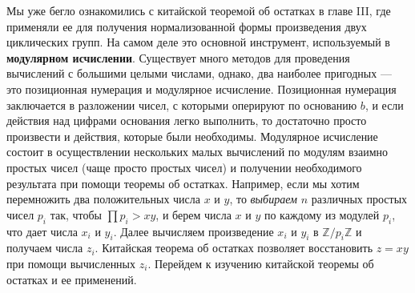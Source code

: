     \noindent Мы уже бегло ознакомились с китайской теоремой об остатках в главе III, где применяли ее для получения нормализованной формы произведения двух циклических групп. На самом деле это основной инструмент, используемый в {\textbf{модулярном исчислении}}. Существует много методов для проведения вычислений с большими целыми числами, однако, два наиболее пригодных — это позиционная нумерация и модулярное исчисление. Позиционная нумерация заключается в разложении чисел, с которыми оперируют по основанию $b$, и если действия над цифрами основания легко выполнить, то достаточно просто произвести и действия, которые были необходимы. Модулярное исчисление состоит в осуществлении нескольких малых вычислений по модулям взаимно простых чисел (чаще просто простых чисел) и получении необходимого результата при помощи теоремы об остатках. Например, если мы хотим перемножить два положительных числа $x$ и $y$, то \textit{выбираем} $n$ различных простых чисел $p_i$ так, чтобы $\prod\nolimits p_i > xy$, и берем числа $x$ и $y$ по каждому из модулей $p_i$, что дает числа $x_i$ и $y_i$. Далее вычисляем произведение $x_i$ и $y_i$ в $\mathbb{Z}/p_i\mathbb{Z}$ и получаем числа $z_i$. Китайская теорема об остатках позволяет восстановить $z = xy$ при помощи вычисленных $z_i$. Перейдем к изучению китайской теоремы об остатках и ее применений.

    \sectiontop
